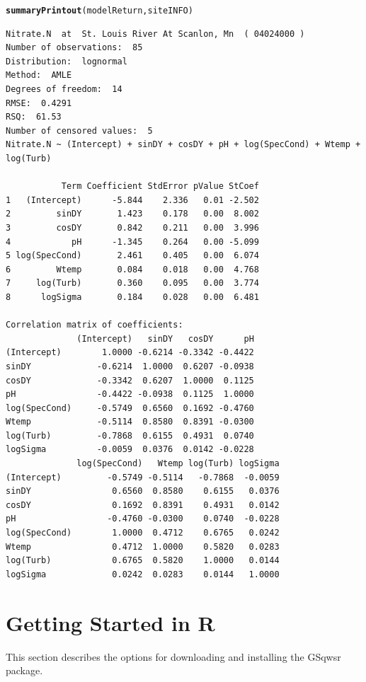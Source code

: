 \documentclass[a4paper,11pt]{article}\usepackage[]{graphicx}\usepackage[]{color}
\makeatletter
\newcommand{\hlstd}[1]{\textcolor[rgb]{0.345,0.345,0.345}{#1}}%
\newcommand{\hlkwd}[1]{\textcolor[rgb]{0.737,0.353,0.396}{\textbf{#1}}}%
\newenvironment{kframe}{%
 \def\at@end@of@kframe{}%
 \ifinner\ifhmode%
  \def\at@end@of@kframe{\end{minipage}}%
  \begin{minipage}{\columnwidth}%
 \fi\fi%
 \def\FrameCommand##1{\hskip\@totalleftmargin \hskip-\fboxsep
 \colorbox{shadecolor}{##1}\hskip-\fboxsep
     \hskip-\linewidth \hskip-\@totalleftmargin \hskip\columnwidth}%
 \MakeFramed {\advance\hsize-\width
   \@totalleftmargin\z@ \linewidth\hsize
   \@setminipage}}%
 {\par\unskip\endMakeFramed%
 \at@end@of@kframe}
\newenvironment{knitrout}{}{} %
\makeatother
\begin{document}
\begin{knitrout}
\color{fgcolor}\begin{kframe}
\begin{alltt}
\hlkwd{summaryPrintout}\hlstd{(modelReturn, siteINFO)}
\end{alltt}
\begin{verbatim}
Nitrate.N  at  St. Louis River At Scanlon, Mn  ( 04024000 )
Number of observations:  85 
Distribution:  lognormal 
Method:  AMLE 
Degrees of freedom:  14 
RMSE:  0.4291 
RSQ:  61.53 
Number of censored values:  5 
Nitrate.N ~ (Intercept) + sinDY + cosDY + pH + log(SpecCond) + Wtemp + log(Turb) 

           Term Coefficient StdError pValue StCoef
1   (Intercept)      -5.844    2.336   0.01 -2.502
2         sinDY       1.423    0.178   0.00  8.002
3         cosDY       0.842    0.211   0.00  3.996
4            pH      -1.345    0.264   0.00 -5.099
5 log(SpecCond)       2.461    0.405   0.00  6.074
6         Wtemp       0.084    0.018   0.00  4.768
7     log(Turb)       0.360    0.095   0.00  3.774
8      logSigma       0.184    0.028   0.00  6.481

Correlation matrix of coefficients: 
              (Intercept)   sinDY   cosDY      pH
(Intercept)        1.0000 -0.6214 -0.3342 -0.4422
sinDY             -0.6214  1.0000  0.6207 -0.0938
cosDY             -0.3342  0.6207  1.0000  0.1125
pH                -0.4422 -0.0938  0.1125  1.0000
log(SpecCond)     -0.5749  0.6560  0.1692 -0.4760
Wtemp             -0.5114  0.8580  0.8391 -0.0300
log(Turb)         -0.7868  0.6155  0.4931  0.0740
logSigma          -0.0059  0.0376  0.0142 -0.0228
              log(SpecCond)   Wtemp log(Turb) logSigma
(Intercept)         -0.5749 -0.5114   -0.7868  -0.0059
sinDY                0.6560  0.8580    0.6155   0.0376
cosDY                0.1692  0.8391    0.4931   0.0142
pH                  -0.4760 -0.0300    0.0740  -0.0228
log(SpecCond)        1.0000  0.4712    0.6765   0.0242
Wtemp                0.4712  1.0000    0.5820   0.0283
log(Turb)            0.6765  0.5820    1.0000   0.0144
logSigma             0.0242  0.0283    0.0144   1.0000
\end{verbatim}
\end{kframe}
\end{knitrout}


\clearpage
\appendix

\section{Getting Started in R}
\label{sec:appendix1}
This section describes the options for downloading and installing the GSqwsr package.
\end{document}
